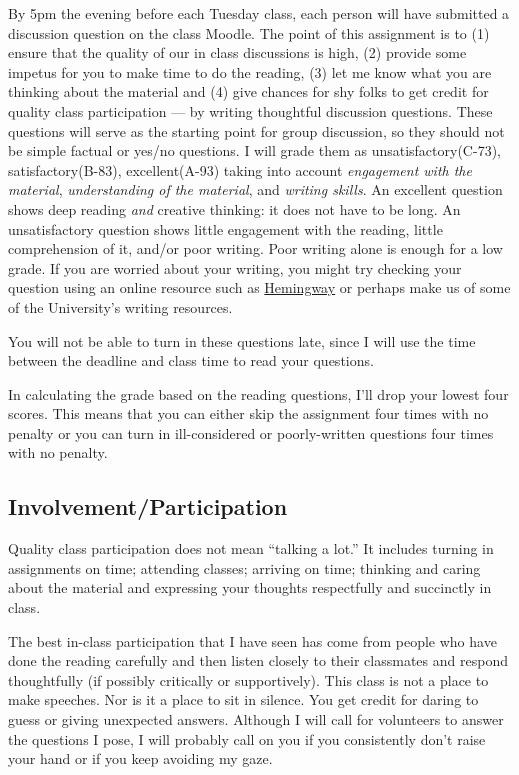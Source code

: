\documentclass[letterpaper]{inzane_syllabus} %
\begin{document}
By 5pm the evening before each Tuesday class, each person will have submitted a
discussion question on the class Moodle. The point of this assignment is to (1)
ensure that the quality of our in class discussions is high, (2) provide some
impetus for you to make time to do the reading, (3) let me know what you are
thinking about the material and (4) give chances for shy folks to get credit
for quality class participation --- by writing thoughtful discussion questions.
These questions will serve as the starting point for group discussion, so they
should not be simple factual or yes/no questions. I will grade them as
unsatisfactory(C-73), satisfactory(B-83), excellent(A-93) taking into account
\emph{engagement with the material}, \emph{understanding of the material}, and
\emph{writing skills}. An excellent question shows deep reading \emph{and}
creative thinking: it does not have to be long. An unsatisfactory question
shows little engagement with the reading, little comprehension of it, and/or
poor writing. Poor writing alone is enough for a low grade. If you are worried
about your writing, you might try checking your question using an online
resource such as \href{http://www.hemingwayapp.com/}{Hemingway} or perhaps make
us of some of the University's writing resources.

You will not be able to turn in these questions late, since I will
use the time between the deadline and class time to read your questions.

In calculating the grade based on the reading questions, I'll drop
your lowest four scores. This means that you can either skip the
assignment four times with no penalty or you can turn in
ill-considered or poorly-written questions four times with no penalty.

\subsection{Involvement/Participation}
Quality class participation does not mean ``talking a lot.''  It
includes turning in assignments on time; attending classes; arriving
on time; thinking and caring about the material and expressing your
thoughts respectfully and succinctly in class.

The best in-class participation that I have seen has come from people
who have done the reading carefully and then listen closely to their
classmates and respond thoughtfully (if possibly critically or
supportively). This class is not a place to make speeches. Nor is it a
place to sit in silence. You get credit for daring to guess or giving
unexpected answers. Although I will call for volunteers to answer the
questions I pose, I will probably call on you if you consistently
don't raise your hand or if you keep avoiding my gaze.
\end{document}
